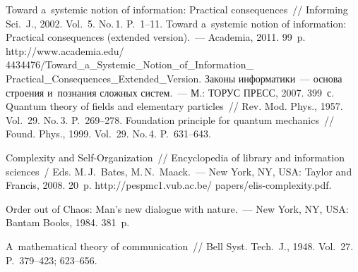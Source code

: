  \begin{multicols}{2}

\renewcommand{\bibname}{\protect\rmfamily Литература}

{\small\frenchspacing
{%
\begin{thebibliography}{99}

 Toward a~systemic notion of information: Practical 
consequences~// Informing Sci.~J., 2002. Vol.~5. No.\,1. P.~1--11. 
 Toward a~systemic notion of information: Practical 
consequences (extended version).~--- Academia, 2011. 99~p. {\sf 
http://www.academia.edu/ 4434476/Toward\_a\_Systemic\_Notion\_of\_Information\_\linebreak 
Practical\_Consequences\_Extended\_Version}. 
 Законы информатики~--- основа строения и~познания сложных 
систем.~--- М.: ТОРУС ПРЕСС, 2007. 399~с. 
 Quantum theory of fields and elementary particles~// Rev. 
Mod. Phys., 1957. Vol.~29. No.\,3. P.~269--278.
 Foundation principle for quantum mechanics~// Found. 
Phys., 1999. Vol.~29. No.\,4. P.~631--643.

 Complexity and Self-Organization~// Encyclopedia of library and 
information sciences~/ Eds. M.\,J.~Bates, M.\,N.~Maack.~--- New York, NY, USA: Taylor 
and Francis, 2008. 20~p. {\sf  http://pespmc1.vub.ac.be/ papers/elis-complexity.pdf}.

 Order out of Chaos:
Man's new dialogue with nature.~--- New York, NY, USA: Bantam Books, 
1984. 381~p.

 A~mathematical theory of communication~// 
Bell Syst. Tech.~J., 1948. Vol.~27. P.~379--423; 623--656.

\columnbreak 


\end{thebibliography}}}
\end{multicols}
